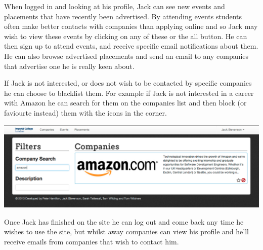     When logged in and looking at his profile, Jack can see new events and placements that have recently been advertised. By attending events students often make better contacts with companies than applying online and so Jack may wish to view these events by clicking on any of these or the all button. He can then sign up to attend events, and receive specific email notifications about them.
    He can also browse advertised placements and send an email to any companies that advertise one he is really keen about.

    If Jack is not interested, or does not wish to be contacted by specific companies he can choose to blacklist them. For example if Jack is not interested in a career with Amazon he can search for them on the companies list and then block (or faviourte instead) them with the icons in the corner. 

    \includegraphics[scale=0.3]{images/user_experiences/student/block_amazon}

    Once Jack has finished on the site he can log out and come back any time he wishes to use the site, but whilst away companies can view his profile and he'll receive emails from companies that wish to contact him.


